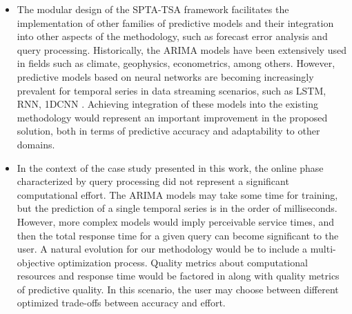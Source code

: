 \begin{itemize}
    \item The modular design of the SPTA-TSA framework facilitates the implementation of other families of predictive models and their integration into other aspects of the methodology, such as forecast error analysis and query processing. Historically, the ARIMA models have been extensively used in fields such as climate, geophysics, econometrics, among others. However, predictive models based on neural networks are becoming increasingly prevalent for temporal series in data streaming scenarios, such as LSTM, RNN, 1DCNN \cite{Shen2020, Torres2021}. Achieving integration of these models into the existing methodology would represent an important improvement in the proposed solution, both in terms of predictive accuracy and adaptability to other domains.

    \item In the context of the case study presented in this work, the online phase characterized by query processing did not represent a significant computational effort. The ARIMA models may take some time for training, but the prediction of a single temporal series is in the order of milliseconds. However, more complex models would imply perceivable service times, and then the total response time for a given query can become significant to the user. A natural evolution for our methodology would be to include a multi-objective optimization process. Quality metrics about computational resources and response time would be factored in along with quality metrics of predictive quality. In this scenario, the user may choose between different optimized trade-offs between accuracy and effort.
\end{itemize}

